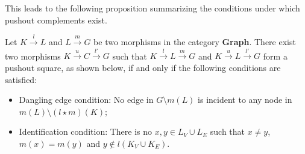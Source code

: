 This leads to the following proposition summarizing the conditions under which pushout complements exist.
\begin{proposition} 
    \label{prop:existence_of_pushout_complement}
    Let $K \overset{l}{\rightarrow} L$ and $L \overset{m}{\rightarrow} G$ be two morphisms in the category \textbf{Graph}. There exist two morphisms $K \overset{u}{\rightarrow} C \overset{l'}{\rightarrow} G$ such that $K \overset{l}{\rightarrow} L \overset{m}{\rightarrow} G$ and $K \overset{u}{\rightarrow} L \overset{l'}{\rightarrow} G$ form a pushout square, as shown 
    below, 
    if and only if the following conditions are satisfied:
    \begin{itemize} 
        \item{Dangling edge condition:} 
        No edge in \(G\mathop{\setminus} m(L)\) is incident to any node in \(m(L) \mathop{\setminus} (l \mathop{\star} m)(K)\);
        \item{Identification condition: } There is no $x,y \mathop{\in} L_V \mathop{\cup} L_E$ such that $x \mathop{\neq} y$, $m(x) \mathop{=} m(y)$ and $y \notin l(K_V \mathop{\cup} K_E)$.
    \end{itemize} 
    \begin{center}
        \end{center}
\end{proposition}
 

